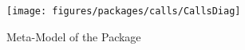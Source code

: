 %
%

\begin{figure}[htb]
  \centering
  \texttt{[image: figures/packages/calls/CallsDiag]}
  \caption{Meta-Model of the  Package}
  \label{fig:MM:calls}
\end{figure}
